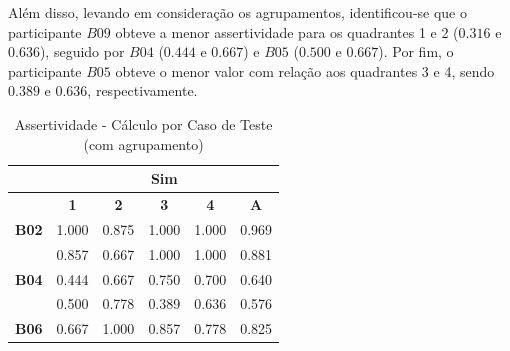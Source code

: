 Além disso, levando em consideração os agrupamentos, identificou-se que o participante $B09$ obteve a menor assertividade para os quadrantes 1 e 2 ($0.316$ e $0.636$), seguido por $B04$ ($0.444$ e $0.667$) e $B05$ ($0.500$ e $0.667$). Por fim, o participante $B05$ obteve o menor valor com relação aos quadrantes 3 e 4, sendo $0.389$ e $0.636$, respectivamente.

\begin{table}[htbp]
	\centering
	\caption{Assertividade - Cálculo por Caso de Teste (com agrupamento)}
	\begin{tabular}{|cccccc|}
		\hline
		\rowcolor[HTML]{D0CECE} 
		\multicolumn{1}{|c|}{\cellcolor[HTML]{F2F2F2}\textbf{Agrupamento}} & \multicolumn{5}{c|}{Sim} \\ \hline
		\rowcolor[HTML]{D0CECE} 
		\multicolumn{1}{|c|}{\cellcolor[HTML]{D0CECE}\textbf{Participante}} & \multicolumn{1}{c|}{\cellcolor[HTML]{D0CECE}\textbf{1}} & \multicolumn{1}{c|}{\cellcolor[HTML]{D0CECE}\textbf{2}} & \multicolumn{1}{c|}{\cellcolor[HTML]{D0CECE}\textbf{3}} & \multicolumn{1}{c|}{\cellcolor[HTML]{D0CECE}\textbf{4}} & \textbf{A} \\ \hline
		\multicolumn{1}{|c|}{\textbf{B02}} & \multicolumn{1}{c|}{1.000} & \multicolumn{1}{c|}{0.875} & \multicolumn{1}{c|}{1.000} & \multicolumn{1}{c|}{1.000} & 0.969 \\ \hline
		\rowcolor[HTML]{F2F2F2} 
		\multicolumn{1}{|c|}{\cellcolor[HTML]{F2F2F2}\textbf{B03}} & \multicolumn{1}{c|}{\cellcolor[HTML]{F2F2F2}0.857} & \multicolumn{1}{c|}{\cellcolor[HTML]{F2F2F2}0.667} & \multicolumn{1}{c|}{\cellcolor[HTML]{F2F2F2}1.000} & \multicolumn{1}{c|}{\cellcolor[HTML]{F2F2F2}1.000} & 0.881 \\ \hline
		\multicolumn{1}{|c|}{\textbf{B04}} & \multicolumn{1}{c|}{0.444} & \multicolumn{1}{c|}{0.667} & \multicolumn{1}{c|}{0.750} & \multicolumn{1}{c|}{0.700} & 0.640 \\ \hline
		\rowcolor[HTML]{F2F2F2} 
		\multicolumn{1}{|c|}{\cellcolor[HTML]{F2F2F2}\textbf{B05}} & \multicolumn{1}{c|}{\cellcolor[HTML]{F2F2F2}0.500} & \multicolumn{1}{c|}{\cellcolor[HTML]{F2F2F2}0.778} & \multicolumn{1}{c|}{\cellcolor[HTML]{F2F2F2}0.389} & \multicolumn{1}{c|}{\cellcolor[HTML]{F2F2F2}0.636} & 0.576 \\ \hline
		\multicolumn{1}{|c|}{\textbf{B06}} & \multicolumn{1}{c|}{0.667} & \multicolumn{1}{c|}{1.000} & \multicolumn{1}{c|}{0.857} & \multicolumn{1}{c|}{0.778} & 0.825 \\ \hline

\end{tabular}
\end{table}

